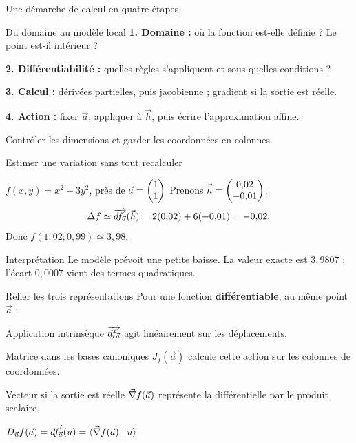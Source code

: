 \begin{frame}[t]{Une démarche de calcul en quatre étapes}
\coursanalyse
\begin{cours}{Du domaine au modèle local}
\textbf{1. Domaine :} où la fonction est-elle définie ? Le point est-il intérieur ?

\medskip
\textbf{2. Différentiabilité :} quelles règles s'appliquent et sous quelles conditions ?

\medskip
\textbf{3. Calcul :} dérivées partielles, puis jacobienne ; gradient si la sortie est réelle.

\medskip
\textbf{4. Action :} fixer $\vec a$, appliquer à $\vec h$, puis écrire l'approximation affine.
\end{cours}
\vfill Contrôler les dimensions et garder les coordonnées en colonnes.
\end{frame}

\begin{frame}[t]{Estimer une variation sans tout recalculer}
\coursanalyse
\begin{exemple}{$f(x,y)=x^2+3y^2$, près de $\vec a=\begin{pmatrix}1\\1\end{pmatrix}$}
Prenons $\vec h=\begin{pmatrix}0{,}02\\-0{,}01\end{pmatrix}$.
\[\Delta f\simeq\overrightarrow{df_{\vec a}}(\vec h)=2(0{,}02)+6(-0{,}01)=-0{,}02.\]
Donc $f(1{,}02;0{,}99)\simeq3{,}98$.
\end{exemple}
\begin{resultat}{Interprétation}
Le modèle prévoit une petite baisse. La valeur exacte est $3{,}9807$ ; l'écart $0{,}0007$ vient des termes quadratiques.
\end{resultat}
\end{frame}

\begin{frame}[t]{Relier les trois représentations}
\coursanalyse
Pour une fonction \textbf{différentiable}, au même point $\vec a$ :
\begin{cours}{Application intrinsèque}
$\overrightarrow{df_{\vec a}}$ agit linéairement sur les déplacements.
\end{cours}
\begin{cours}{Matrice dans les bases canoniques}
$J_f(\vec a)$ calcule cette action sur les colonnes de coordonnées.
\end{cours}
\begin{resultat}{Vecteur si la sortie est réelle}
$\vec\nabla f(\vec a)$ représente la différentielle par le produit scalaire.

\medskip
$D_{\vec u}f(\vec a)=\overrightarrow{df_{\vec a}}(\vec u)=\langle \vec\nabla f(\vec a)\mid \vec u\rangle$.
\end{resultat}
\end{frame}

